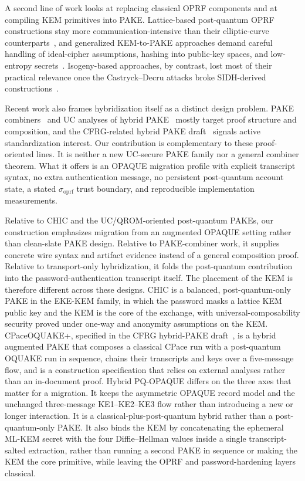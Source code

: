 \documentclass{ieeeijc}
\newcommand{\sigoprf}{\sigma_{\mathrm{oprf}}}
\theoremstyle{remark}
\begin{document}
A second line of work looks at replacing classical OPRF
components and at compiling KEM primitives into PAKE.
Lattice-based post-quantum OPRF constructions stay
more communication-intensive than their elliptic-curve counterparts~\cite{esgin2024}, and generalized KEM-to-PAKE approaches demand
careful handling of ideal-cipher assumptions, hashing into public-key
spaces, and low-entropy secrets~\cite{arriaga2024}. Isogeny-based
approaches, by contrast, lost most of their practical relevance once the
Castryck--Decru attacks broke SIDH-derived constructions~\cite{castryck2023}.

Recent work also frames hybridization itself as a distinct design
problem. PAKE combiners~\cite{hesse2024} and UC analyses of hybrid
PAKE~\cite{lyu2024hybrid} mostly target proof structure and
composition, and the CFRG-related hybrid PAKE draft~\cite{vos2025}
signals active standardization interest. Our contribution is complementary
to these proof-oriented lines. It is neither a new UC-secure PAKE family nor a
general combiner theorem. What it offers is an OPAQUE migration profile
with explicit transcript syntax, no extra authentication message, no
persistent post-quantum account state, a stated $\sigoprf$ trust
boundary, and reproducible implementation measurements.

Relative to CHIC and the UC/QROM-oriented post-quantum PAKEs, our
construction emphasizes migration from an augmented OPAQUE setting rather
than clean-slate PAKE design. Relative to PAKE-combiner work, it supplies
concrete wire syntax and artifact evidence instead of a general
composition proof. Relative to transport-only hybridization, it folds
the post-quantum contribution into the password-authentication
transcript itself.
The placement of the KEM is therefore different across these designs. CHIC is a
balanced, post-quantum-only PAKE in the EKE-KEM family, in which the password
masks a lattice KEM public key and the KEM is the core of the exchange, with
universal-composability security proved under one-way and anonymity assumptions
on the KEM. CPaceOQUAKE+, specified in the CFRG hybrid-PAKE draft~\cite{vos2025},
is a hybrid augmented PAKE that composes a classical CPace run with a
post-quantum OQUAKE run in sequence, chains their transcripts and keys over a
five-message flow, and is a construction specification that relies on external
analyses rather than an in-document proof. Hybrid PQ-OPAQUE differs on the three
axes that matter for a migration. It keeps the asymmetric OPAQUE record model
and the unchanged three-message KE1--KE2--KE3 flow rather than introducing a new
or longer interaction. It is a classical-plus-post-quantum hybrid rather than a
post-quantum-only PAKE. It also binds the KEM by concatenating the ephemeral
ML-KEM secret with the four Diffie--Hellman values inside a single
transcript-salted extraction, rather than running a second PAKE in sequence or
making the KEM the core primitive, while leaving the OPRF and password-hardening
layers classical.
\end{document}
